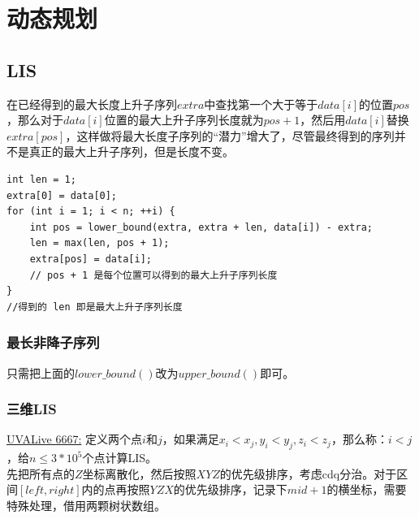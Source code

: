 %
%

\chapter{动态规划}

\section{LIS}
在已经得到的最大长度上升子序列$extra$中查找第一个大于等于$data[i]$的位置$pos$，那么对于$data[i]$位置的最大上升子序列长度就为$pos+1$，然后用$data[i]$替换$extra[pos]$，这样做将最大长度子序列的“潜力”增大了，尽管最终得到的序列并不是真正的最大上升子序列，但是长度不变。

\begin{lstlisting}
int len = 1;
extra[0] = data[0];
for (int i = 1; i < n; ++i) {
	int pos = lower_bound(extra, extra + len, data[i]) - extra;
	len = max(len, pos + 1);
	extra[pos] = data[i];
	// pos + 1 是每个位置可以得到的最大上升子序列长度
}
//得到的 len 即是最大上升子序列长度
\end{lstlisting}

\subsection{最长非降子序列}
只需把上面的$lower\_bound()$改为$upper\_bound()$即可。

\subsection{三维LIS}

\underline {UVALive 6667:} 定义两个点$i$和$j$，如果满足$x_i < x_j,y_i < y_j, z_i < z_j$，那么称：$i < j$，给$n\leq 3*10^5$个点计算LIS。 \\

先把所有点的$Z$坐标离散化，然后按照$XYZ$的优先级排序，考虑cdq分治。对于区间$[left, right]$内的点再按照$YZX$的优先级排序，记录下$mid+1$的横坐标，需要特殊处理，借用两颗树状数组。\\

